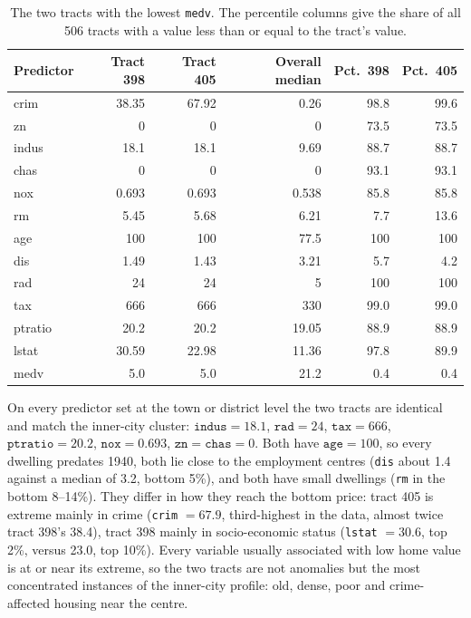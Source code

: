 \documentclass[11pt]{article}
\begin{document}
\begin{table}[H]
  \centering
  \begin{tabular}{lrrrrr}
    \toprule
    Predictor & Tract 398 & Tract 405 & Overall median & Pct.~398 & Pct.~405 \\
    \midrule
    crim    & 38.35 & 67.92 & 0.26  & 98.8 & 99.6 \\
    zn      & 0     & 0     & 0     & 73.5 & 73.5 \\
    indus   & 18.1  & 18.1  & 9.69  & 88.7 & 88.7 \\
    chas    & 0     & 0     & 0     & 93.1 & 93.1 \\
    nox     & 0.693 & 0.693 & 0.538 & 85.8 & 85.8 \\
    rm      & 5.45  & 5.68  & 6.21  & 7.7  & 13.6 \\
    age     & 100   & 100   & 77.5  & 100  & 100 \\
    dis     & 1.49  & 1.43  & 3.21  & 5.7  & 4.2 \\
    rad     & 24    & 24    & 5     & 100  & 100 \\
    tax     & 666   & 666   & 330   & 99.0 & 99.0 \\
    ptratio & 20.2  & 20.2  & 19.05 & 88.9 & 88.9 \\
    lstat   & 30.59 & 22.98 & 11.36 & 97.8 & 89.9 \\
    medv    & 5.0   & 5.0   & 21.2  & 0.4  & 0.4 \\
    \bottomrule
  \end{tabular}
  \caption{The two tracts with the lowest \texttt{medv}. The percentile columns give the share of all 506 tracts with a value less than or equal to the tract's value.}
  \label{tab:boston-h}
\end{table}

On every predictor set at the town or district level the two tracts are identical and match the inner-city cluster: $\texttt{indus} = 18.1$, $\texttt{rad} = 24$, $\texttt{tax} = 666$, $\texttt{ptratio} = 20.2$, $\texttt{nox} = 0.693$, $\texttt{zn} = \texttt{chas} = 0$. Both have $\texttt{age} = 100$, so every dwelling predates 1940, both lie close to the employment centres (\texttt{dis} about 1.4 against a median of 3.2, bottom 5\%), and both have small dwellings (\texttt{rm} in the bottom 8--14\%). They differ in how they reach the bottom price: tract 405 is extreme mainly in crime (\texttt{crim} $= 67.9$, third-highest in the data, almost twice tract 398's 38.4), tract 398 mainly in socio-economic status (\texttt{lstat} $= 30.6$, top 2\%, versus 23.0, top 10\%). Every variable usually associated with low home value is at or near its extreme, so the two tracts are not anomalies but the most concentrated instances of the inner-city profile: old, dense, poor and crime-affected housing near the centre.
\end{document}
